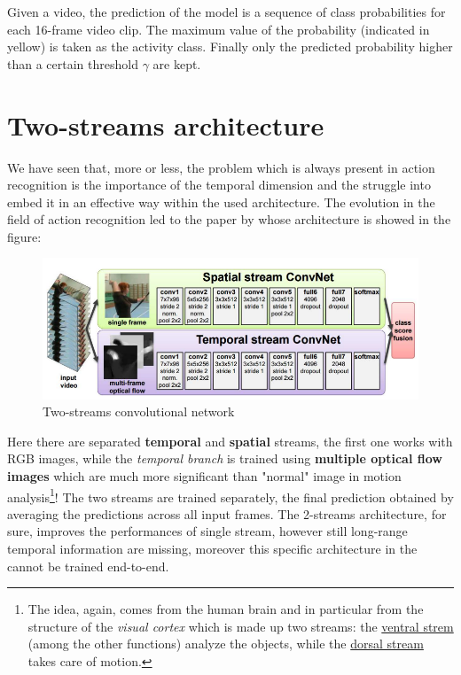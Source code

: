 Given a video, the prediction of the model is a sequence of class probabilities for each 16-frame video clip. The maximum value of the probability (indicated in yellow) is taken as the activity class. Finally only the predicted probability higher than a certain threshold $\gamma$ are kept.

\section{Two-streams architecture}
We have seen that, more or less, the problem which is always present in action recognition is the importance of the temporal dimension and the struggle into embed it in an effective way within the used architecture. The evolution in the field of action recognition led to the paper \textit{\cite{simonyan2014two} } by \citeauthor{simonyan2014two} whose architecture is showed in the figure:
\begin{figure}[h]
    \centering
    \includegraphics[scale=0.7]{img/2streams.png}
    \caption{Two-streams convolutional network}
    \label{fig:2stream}
\end{figure}
Here there are separated \textbf{temporal} and \textbf{spatial} streams, the first one works with RGB images, while the \textit{temporal branch} is trained using \textbf{multiple optical flow images} which are much more significant than "normal" image in motion analysis\footnote{
    The idea, again, comes  from the human brain and in particular from the structure of the \textit{visual cortex} which is made up two streams: the \underline{ventral strem} (among the other functions) analyze  the objects, while the \underline{dorsal stream} takes care of motion.
}! 
The two streams are trained separately, the final prediction obtained by averaging the predictions across all input frames. The 2-streams architecture, for sure, improves the performances of single stream, however still long-range temporal information are missing, moreover this specific architecture in the  cannot be trained end-to-end.

